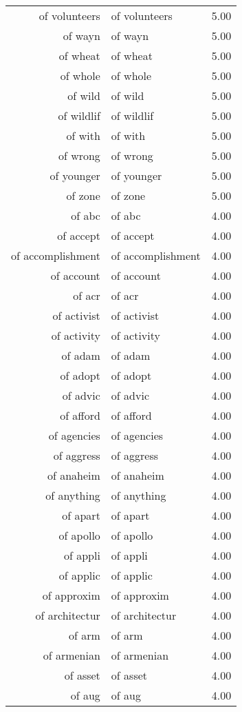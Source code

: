 \begin{table}[ht]
\begin{tabular}{rlr}
  of volunteers & of volunteers & 5.00 \\ 
  of wayn & of wayn & 5.00 \\ 
  of wheat & of wheat & 5.00 \\ 
  of whole & of whole & 5.00 \\ 
  of wild & of wild & 5.00 \\ 
  of wildlif & of wildlif & 5.00 \\ 
  of with & of with & 5.00 \\ 
  of wrong & of wrong & 5.00 \\ 
  of younger & of younger & 5.00 \\ 
  of zone & of zone & 5.00 \\ 
  of abc & of abc & 4.00 \\ 
  of accept & of accept & 4.00 \\ 
  of accomplishment & of accomplishment & 4.00 \\ 
  of account & of account & 4.00 \\ 
  of acr & of acr & 4.00 \\ 
  of activist & of activist & 4.00 \\ 
  of activity & of activity & 4.00 \\ 
  of adam & of adam & 4.00 \\ 
  of adopt & of adopt & 4.00 \\ 
  of advic & of advic & 4.00 \\ 
  of afford & of afford & 4.00 \\ 
  of agencies & of agencies & 4.00 \\ 
  of aggress & of aggress & 4.00 \\ 
  of anaheim & of anaheim & 4.00 \\ 
  of anything & of anything & 4.00 \\ 
  of apart & of apart & 4.00 \\ 
  of apollo & of apollo & 4.00 \\ 
  of appli & of appli & 4.00 \\ 
  of applic & of applic & 4.00 \\ 
  of approxim & of approxim & 4.00 \\ 
  of architectur & of architectur & 4.00 \\ 
  of arm & of arm & 4.00 \\ 
  of armenian & of armenian & 4.00 \\ 
  of asset & of asset & 4.00 \\ 
  of aug & of aug & 4.00 \\ 

\end{tabular}
\end{table}
